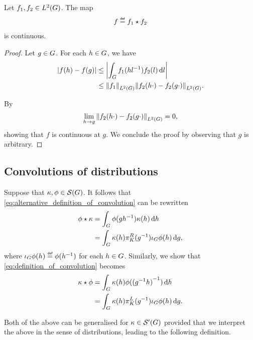 \begin{lemma}
    Let $f_1, f_2 \in \Lebesgue 2 \Group$.
    The map
    \begin{align*}
        f \defeq \conv {f_1} {f_2}
    \end{align*}
    is continuous.
\end{lemma}
\begin{proof}
    Let $g \in \Group$.
    For each $h \in \Group$,
    we have
    \begin{align*}
        \abs {f(h) - f(g)} &\leq \abs {\int_\Group f_1(h l^{-1}) f_2(l) \dd l}\\
        &\leq \norm [\Lebesgue 2 \Group] {f_1} \norm [\Lebesgue 2 \Group] {f_2(h \dummy) - f_2(g \dummy)}.
    \end{align*}

    By %
    \begin{align*}
        \lim_{h \to g} \norm [\Lebesgue 2 \Group] {f_2(h \dummy) - f_2(g \dummy)} = 0,
    \end{align*}
    showing that $f$ is continuous at $g$.
    We conclude the proof by observing that $g$ is arbitrary.
\end{proof}

\subsection{Convolutions of distributions}

Suppose that $\kappa, \phi \in \Schwartz \Group$.
It follows that \eqref{eq:alternative_definition_of_convolution} can be rewritten
\begin{align*}
    \conv \phi \kappa &= \int_\Group \phi(g h^{-1}) \kappa(h) \dd h\\
    &= \int_\Group \kappa(h) \RightRegularRepresentation(g^{-1}) \InverseFunctionArgument \phi(h) \dd g,
\end{align*}
where $\InverseFunctionArgument \phi(h) \defeq \phi(h^{-1})$ for each $h \in \Group$.
Similarly, we show that \eqref{eq:definition_of_convolution} becomes
\begin{align*}
    \conv \kappa \phi &= \int_\Group \kappa(h) \phi({(g^{-1} h)}^{-1}) \dd h\\
    &= \int_\Group \kappa(h) \LeftRegularRepresentation(g^{-1}) \InverseFunctionArgument \phi(h) \dd g.
\end{align*}

Both of the above can be generalised for $\kappa \in \TemperedDistributions \Group$
provided that we interpret the above in the sense of distributions,
leading to the following definition.

